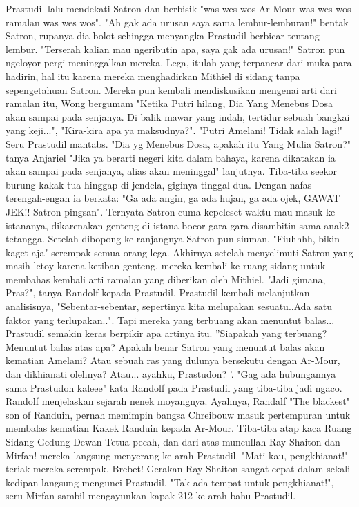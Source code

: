 \documentclass[a4paper,11pt,final]{article}
\begin{document}
Prastudil lalu mendekati Satron dan berbisik "was wes wos Ar-Mour was wes wos ramalan was wes wos".
"Ah gak ada urusan saya sama lembur-lemburan!" bentak Satron, rupanya dia bolot sehingga menyangka Prastudil berbicar tentang lembur. "Terserah kalian mau ngeributin apa, saya gak ada urusan!" Satron pun ngeloyor pergi meninggalkan mereka.
Lega, itulah yang terpancar dari muka para hadirin, hal itu karena mereka menghadirkan Mithiel di sidang tanpa sepengetahuan Satron.
Mereka pun kembali mendiskusikan mengenai arti dari ramalan itu, Wong bergumam "Ketika Putri hilang, Dia Yang Menebus Dosa akan sampai pada senjanya. Di balik mawar yang indah, tertidur sebuah bangkai yang keji...", "Kira-kira apa ya maksudnya?".
"Putri Amelani! Tidak salah lagi!" Seru Prastudil mantabs.
"Dia yg Menebus Dosa, apakah itu Yang Mulia Satron?" tanya Anjariel "Jika ya berarti negeri kita dalam bahaya, karena dikatakan ia akan sampai pada senjanya, alias akan meninggal" lanjutnya.
Tiba-tiba seekor burung kakak tua hinggap di jendela, giginya tinggal dua. Dengan nafas terengah-engah ia berkata: "Ga ada angin, ga ada hujan, ga ada ojek, GAWAT JEK!! Satron pingsan".
Ternyata Satron cuma kepeleset waktu mau masuk ke istananya, dikarenakan genteng di istana bocor gara-gara disambitin sama anak2 tetangga. Setelah dibopong ke ranjangnya Satron pun siuman. "Fiuhhhh, bikin kaget aja" serempak semua orang lega.
Akhirnya setelah menyelimuti Satron yang masih letoy karena ketiban genteng, mereka kembali ke ruang sidang untuk membahas kembali arti ramalan yang diberikan oleh Mithiel.
"Jadi gimana, Pras?", tanya Randolf kepada Prastudil. Prastudil kembali melanjutkan analisisnya, "Sebentar-sebentar, sepertinya kita melupakan sesuatu..Ada satu faktor yang terlupakan..".
Tapi mereka yang terbuang akan menuntut balas... Prastudil semakin keras berpikir apa artinya itu.
''Siapakah yang terbuang? Menuntut balas atas apa? Apakah benar Satron yang menuntut balas akan kematian Amelani? Atau sebuah ras yang dulunya bersekutu dengan Ar-Mour, dan dikhianati olehnya? Atau... ayahku, Prastudon? '.
"Gag ada hubungannya sama Prastudon kaleee" kata Randolf pada Prastudil yang tiba-tiba jadi ngaco.
Randolf menjelaskan sejarah nenek moyangnya. Ayahnya, Randalf "The blackest" son of Randuin, pernah memimpin bangsa Chreibouw masuk pertempuran untuk membalas kematian Kakek Randuin kepada Ar-Mour.
Tiba-tiba atap kaca Ruang Sidang Gedung Dewan Tetua pecah, dan dari atas muncullah Ray Shaiton dan Mirfan! mereka langsung menyerang ke arah Prastudil. "Mati kau, pengkhianat!" teriak mereka serempak.
Brebet! Gerakan Ray Shaiton sangat cepat dalam sekali kedipan langsung mengunci Prastudil. "Tak ada tempat untuk pengkhianat!", seru Mirfan sambil mengayunkan kapak 212 ke arah bahu Prastudil.
\end{document}
